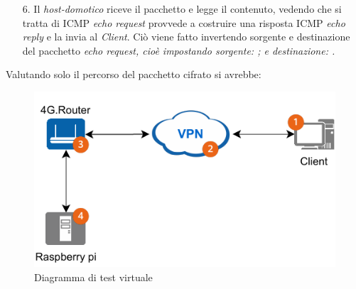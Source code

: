 \begin{enumerate}
    Possiamo vedere il pacchetto in uscita dal server mettendoci in ascolto sull'interfaccia \it{ens3}:
\begin{bashcode}{Server}{}
$ sudo tcpdump -i ens3 -n port 1194
15:43:15.543273 IP 51.178.141.119.1194 > 151.47.152.251.40637: UDP, length 108
\end{bashcode}


    \item[4.] Il NAT effettua la traduzione, modificando l'IP e la porta del pacchetto esterno e lo inoltra all'interfaccia \textit{wan} del \textit{Router}.
    

    \item[5.] Il \textit{Router} riceve il pacchetto e lo decifra. Vedendo che il pacchetto interno è destinato alla subnet \code{192.168.130.0/24} lo inoltra alla sua \textit{lan} (sezione \ref{subsec:creazione-firewall-zone-vpn} e \ref{subsec:aggiunta-interfaccia-tun0-zona-vpn}). Il pacchetto interno viene quindi inoltrato all'\textit{host-domotico} (\code{192.168.130.2}). In questo caso è possibile vedere il percorso del pacchetto decifrato con \code{tcpdump}:
\begin{bashcode}{Router}{}
$ tcpdump -i tun0
listening on tun0, link-type RAW (Raw IP), capture size 262144 bytes
10:44:07.228387 IP 10.8.0.2 > 192.168.130.2: ICMP echo request, id 12, seq 1, length 64
\end{bashcode}
    
    \item[6.] Il \textit{host-domotico} riceve il pacchetto e legge il contenuto, vedendo che si tratta di ICMP \textit{echo request} provvede a costruire una risposta ICMP \textit{echo reply} e la invia al \textit{Client}. Ciò viene fatto invertendo sorgente e destinazione del pacchetto \it{echo request}, cioè impostando sorgente: ; e destinazione: .

\end{enumerate}

Valutando solo il percorso del pacchetto cifrato si avrebbe:

\begin{figure}[H]
    \centering
    \includegraphics[width=0.5\linewidth]{immagini/diag2-test_virtual}
    \caption{Diagramma di test virtuale}
    \label{fig:diag-test_virtual}
\end{figure}


